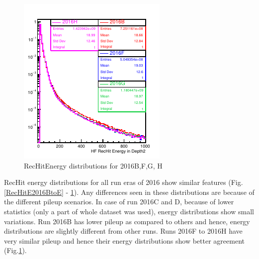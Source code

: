 \begin{figure}[!h]
\begin{minipage}[c]{0.32\linewidth}
\end{minipage}
\begin{minipage}[c]{0.32\linewidth}
\centering
\includegraphics[width=0.99\linewidth]{../Figures/Chap2/ImageFiles_HF/BasicPics/Comp2016/RecHitsES2016BFGH.pdf}
\end{minipage}
\caption{RecHitEnergy distributions for 2016B,F,G, H}
\label{RecHitE2016BFGH}
\end{figure}
RecHit energy distributions for all run eras of 2016 show similar features (Fig.\ref{RecHitE2016BtoE} - \ref{RecHitE2016BFGH}). Any differences seen in these distributions are because of the different pileup scenarios. In case of run 2016C and D, because of lower statistics (only a part of whole dataset was used), energy distributions show small variations. Run 2016B has lower pileup as compared to others and hence, energy distributions are slightly different from other runs. Runs 2016F to 2016H have very similar pileup and hence their energy distributions show better agreement (Fig.\ref{RecHitE2016BFGH}).\\

